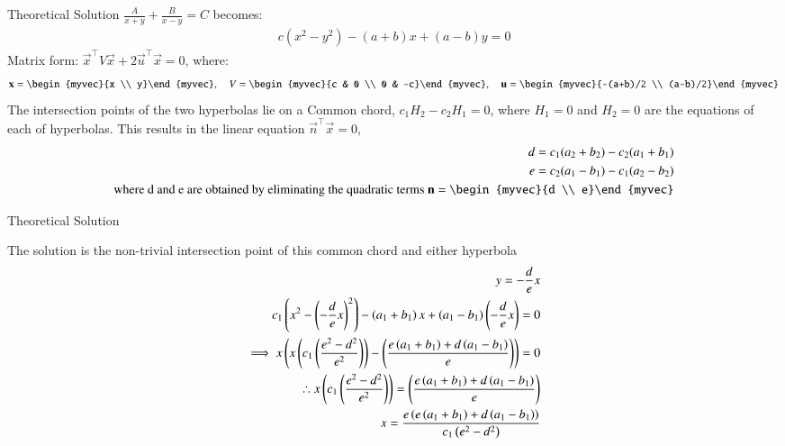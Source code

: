 \documentclass{beamer}
\begin{document}
	\begin{frame}{Theoretical Solution}
	 $\frac{A}{x+y} + \frac{B}{x-y} = C$ becomes:
	\begin{align}
		c(x^2 - y^2) - (a+b)x + (a-b)y = 0 \label{eq:hyperbola_form}
	\end{align}
	Matrix form: $\vec{x}^\top V \vec{x} + 2\vec{u}^\top \vec{x} = 0$, where:
	\begin{align}
		\vec{x} = \begin{myvec}{x \\ y}\end{myvec}, \quad
		V = \begin{myvec}{c & 0 \\ 0 & -c}\end{myvec}, \quad
		\vec{u} = \begin{myvec}{-(a+b)/2 \\ (a-b)/2}\end{myvec} \label{eq:matrix_defs}
	\end{align}
	The intersection points of the two hyperbolas lie on a Common chord, $c_1H_2-c_2H_1=0$, where $H_1=0$ and $H_2=0$ are the equations of each of hyperbolas. This results in the linear equation $\vec{n}^\top\vec{x}=0$,
	\begin{align}
		d = c_1(a_2+b_2) - c_2(a_1+b_1) \label{eq:D_coeff} \\
		e = c_2(a_1-b_1) - c_1(a_2-b_2) \label{eq:E_coeff} \\
		\text{where d and e are obtained by eliminating the quadratic terms  } \vec{n} = \begin{myvec}{d \\ e}\end{myvec}
	\end{align}
	\end{frame}
		\begin{frame}{Theoretical Solution}
		
	The solution is the non-trivial intersection point of this common chord and either hyperbola
	\begin{align}
		y = -\frac{d}{e}x \label{eq:y_formula} \\
		c_1\left(x^2 - \left(-\frac{d}{e}x\right)^2\right) - \left(a_1+b_1\right)x + \left(a_1-b_1\right)\left(-\frac{d}{e}x\right) = 0 \\
		\implies x \left( x\left(c_1\left(\frac{e^2-d^2}{e^2}\right)\right) - \left(\frac{e\left(a_1+b_1\right) + d\left(a_1-b_1\right)}{e}\right) \right) = 0 \\
		\therefore x\left(c_1\left(\frac{e^2-d^2}{e^2}\right)\right) = \left(\frac{e\left(a_1+b_1\right)+d\left(a_1-b_1\right)}{e}\right) \\
		x = \frac{e\left(e\left(a_1+b_1\right)+d\left(a_1-b_1\right)\right)}{c_1\left(e^2-d^2\right)} \label{eq:x_formula}
	\end{align}
	\end{frame}
\end{document}
